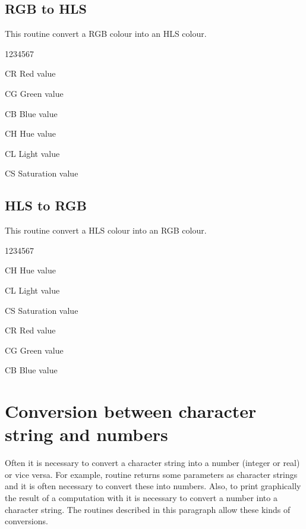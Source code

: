 \subsection{RGB to HLS}
\Action
This routine convert a RGB colour into an HLS colour.
\Pdesc
\begin{DLtt}{1234567}
\item[CR] Red value 
\item[CG] Green value 
\item[CB] Blue value 
\item[CH] Hue value 
\item[CL] Light value 
\item[CS] Saturation value 
\end{DLtt}

\subsection{HLS to RGB}
\Action
This routine convert a HLS colour into an RGB colour.
\Pdesc
\begin{DLtt}{1234567}
\item[CH] Hue value 
\item[CL] Light value 
\item[CS] Saturation value 
\item[CR] Red value 
\item[CG] Green value 
\item[CB] Blue value 
\end{DLtt}

\newpage
 
\section{Conversion between character string and numbers}

Often it is necessary to convert a \FORTRAN{} character string into
a number (integer or real) or vice versa. For example, routine 
returns some parameters as character strings and it is often necessary to convert
these into numbers. 
Also, to print graphically the result of a computation with
 it is necessary to convert a number into a character string. 
The routines described in this paragraph allow these kinds of conversions.

